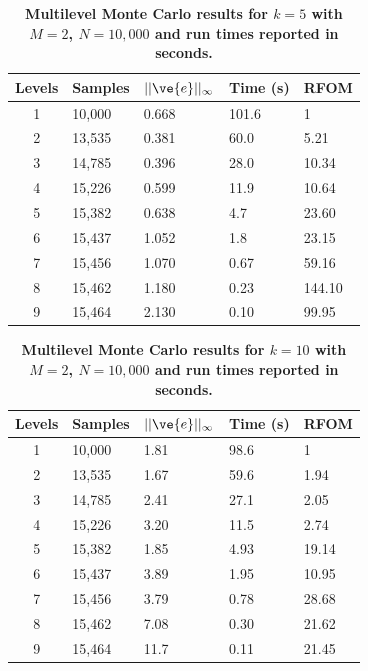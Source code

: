\documentclass[note]{TechNote}
\begin{document}
\begin{table}[h!]
  \begin{center}
    \begin{tabular}{cllll}\hline\hline
      \multicolumn{1}{c}{\textbf{Levels}} & 
      \multicolumn{1}{l}{\textbf{Samples}} & 
      \multicolumn{1}{l}{\textbf{$||\ve{e}||_{\infty}$}} & 
      \multicolumn{1}{l}{\textbf{Time (s)}} & 
      \multicolumn{1}{l}{\textbf{RFOM}} \\
      \hline
      1 & 10,000 & 0.668 & 101.6 & 1 \\
      2 & 13,535 & 0.381 & 60.0 & 5.21 \\
      3 & 14,785 & 0.396 & 28.0 & 10.34 \\
      4 & 15,226 & 0.599 & 11.9 & 10.64 \\
      5 & 15,382 & 0.638 & 4.7 & 23.60 \\
      6 & 15,437 & 1.052 & 1.8 & 23.15 \\
      7 & 15,456 & 1.070 & 0.67 & 59.16 \\
      8 & 15,462 & 1.180 & 0.23 & 144.10 \\
      9 & 15,464 & 2.130 & 0.10 & 99.95 \\
      \hline\hline
    \end{tabular}
  \end{center}
  \caption{\textbf{Multilevel Monte Carlo results for $k = 5$ with $M
      = 2$, $N = 10,000$ and run times reported in seconds.}}
  \label{tab:k5_results}
\end{table}
\begin{table}[h!]
  \begin{center}
    \begin{tabular}{cllll}\hline\hline
      \multicolumn{1}{c}{\textbf{Levels}} & 
      \multicolumn{1}{l}{\textbf{Samples}} & 
      \multicolumn{1}{l}{\textbf{$||\ve{e}||_{\infty}$}} & 
      \multicolumn{1}{l}{\textbf{Time (s)}} & 
      \multicolumn{1}{l}{\textbf{RFOM}} \\
      \hline
      1 & 10,000 & 1.81 & 98.6 & 1 \\
      2 & 13,535 & 1.67 & 59.6 & 1.94 \\
      3 & 14,785 & 2.41 & 27.1 & 2.05 \\
      4 & 15,226 & 3.20 & 11.5 & 2.74 \\
      5 & 15,382 & 1.85 & 4.93 & 19.14 \\
      6 & 15,437 & 3.89 & 1.95 & 10.95 \\
      7 & 15,456 & 3.79 & 0.78 & 28.68 \\
      8 & 15,462 & 7.08 & 0.30 & 21.62 \\
      9 & 15,464 & 11.7 & 0.11 & 21.45 \\
      \hline\hline
    \end{tabular}
  \end{center}
  \caption{\textbf{Multilevel Monte Carlo results for $k = 10$ with $M
      = 2$, $N = 10,000$ and run times reported in seconds.}}
  \label{tab:k10_results}
\end{table}




\closing
\caution
\end{document}
